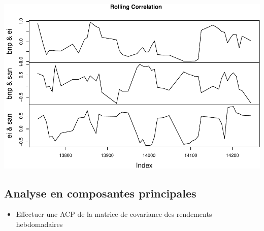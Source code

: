 \documentclass[
]{article}
\providecommand{\tightlist}{%
  \setlength{\itemsep}{0pt}\setlength{\parskip}{0pt}}
\begin{document}
\includegraphics{TP-1_files/figure-latex/correl-roll-1.pdf}

\hypertarget{analyse-en-composantes-principales}{%
\subsection{Analyse en composantes
principales}\label{analyse-en-composantes-principales}}

\begin{itemize}
\tightlist
\item
  Effectuer une ACP de la matrice de covariance des rendements
  hebdomadaires
\end{itemize}
\end{document}
